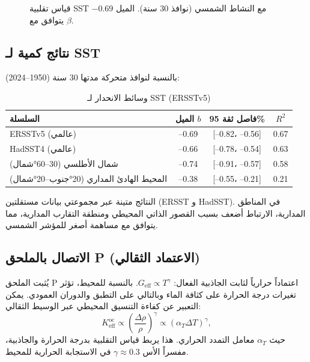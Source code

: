 \documentclass[11pt,a4paper]{article}
\newcommand{\Keff}{K_{\mathrm{eff}}}
\newcommand{\be}{\beta}
\newcommand{\ga}{\gamma}
\begin{document}
	\begin{figure}[htbp]
		\centering
		\caption{قياس تقلبية SST مع النشاط الشمسي (نوافذ 30 سنة). الميل \(-0.69\) يتوافق مع \(\be\).}
		\label{fig:sst_scaling}
	\end{figure}
	
	\subsection{نتائج كمية لـ SST}
	
	بالنسبة لنوافذ متحركة مدتها 30 سنة (1950–2024):
	
	\begin{table}[htbp]
		\centering
		\caption{وسائط الانحدار لـ SST (ERSSTv5)}
		\label{tab:sst_reg}
		\begin{tabular}{@{}lccc@{}}
			\toprule
			السلسلة & الميل \(b\) & فاصل ثقة 95\% & \(R^2\) \\
			\midrule
			ERSSTv5 (عالمي) & –0.69 & [–0.82، –0.56] & 0.67 \\
			HadSST4 (عالمي)  & –0.66 & [–0.78، –0.54] & 0.63 \\
			شمال الأطلسي (30–60°شمال) & –0.74 & [–0.91، –0.57] & 0.58 \\
			المحيط الهادئ المداري (20°جنوب–20°شمال) & –0.38 & [–0.55، –0.21] & 0.21 \\
			\bottomrule
		\end{tabular}
	\end{table}
	
	النتائج متينة عبر مجموعتي بيانات مستقلتين (ERSST و HadSST). في المناطق المدارية، الارتباط أضعف بسبب القصور الذاتي المحيطي ومنطقة التقارب المدارية، مما يتوافق مع مساهمة أصغر للمؤشر الشمسي.
	
	\subsection{الاتصال بالملحق P (الاعتماد الثقالي)}
	
	يُثبت الملحق P اعتماداً حرارياً لثابت الجاذبية الفعال: \(G_{\text{eff}} \propto T^{\ga}\). بالنسبة للمحيط، تؤثر تغيرات درجة الحرارة على كثافة الماء وبالتالي على التطبق والدوران العمودي. يمكن التعبير عن كفاءة التنسيق المحيطي عبر الوسيط الثقالي:
	\[
	\Keff^{\text{oc}} \propto \left( \frac{\Delta \rho}{\rho} \right)^{\ga} \propto (\alpha_T \Delta T)^{\ga},
	\]
	حيث \(\alpha_T\) معامل التمدد الحراري. هذا يربط قياس التقلبية بدرجة الحرارة والجاذبية، مفسراً الأس \(\ga \approx 0.3\) في الاستجابة الحرارية للمحيط.
	
\end{document}
